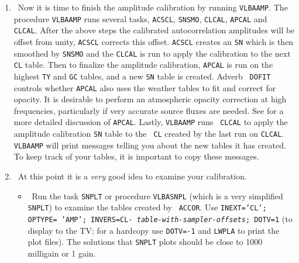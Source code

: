 \begin{enumerate}
\item\ {Now it is time to finish the amplitude calibration by running
{\tt VLBAAMP}\@. The procedure {\tt VLBAAMP} runs several tasks,
{\tt ACSCL}, {\tt SNSMO}, {\tt CLCAL}, {\tt APCAL} and {\tt
CLCAL}\@.  After the above steps the calibrated autocorrelation
amplitudes will be offset from unity, {\tt ACSCL} corrects this
offset.  {\tt ACSCL} creates an {\tt SN} which is then smoothed
by {\tt SNSMO} and the {\tt CLCAL} is run to apply the calibration
to the next {\tt CL} table.  Then to finalize the amplitude
calibration, {\tt APCAL} is run on the highest {\tt TY} and
{\tt GC} tables, and a new {\tt SN} table is created.  Adverb {\tt
DOFIT} controls whether {\tt APCAL} also uses the weather tables to
fit and correct for opacity.  It is desirable to perform an
atmospheric opacity correction at high frequencies, particularly if
very accurate source fluxes are needed. See  for a more
detailed discussion of {\tt APCAL}\@. Lastly, {\tt VLBAAMP} runs {\tt
CLCAL} to apply the amplitude calibration {\tt SN} table to the {\tt
CL} created by the last run on {\tt CLCAL}\@.  {\tt VLBAAMP} will print messages
telling you about the new tables it has created. To keep track of your
tables, it is important to copy these
messages.}

\item\ {At this point it is a {\it very} good idea to examine your
calibration.}

\begin{itemize}

\item\ {Run the task {\tt SNPLT} or procedure {\tt VLBASNPL} (which is
a very simplified {\tt SNPLT}) to examine the tables created by {\tt
ACCOR}\@.  Use {\tt INEXT='CL'; OPTYPE= 'AMP'; INVERS=CL-{\it
table-with-sampler-offsets}; DOTV=1} (to display to the TV; for a
hardcopy use {\tt DOTV=-1} and {\tt LWPLA} to print the plot files).
The solutions that {\tt SNPLT} plots should be close to 1000 milligain
or 1 gain.}


\end{itemize}
\end{enumerate}

